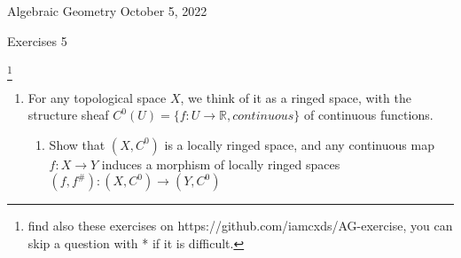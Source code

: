 \documentclass[a4paper,11pt]{article}
\def\bb#1{\mathbb{#1}}
\begin{document}
{\small Algebraic Geometry \hfill October 5, 2022 \\}
\begin{center}
\Huge Exercises 5
\end{center}

\vskip0.6cm
\footnote{find also these exercises on https://github.com/iamcxds/AG-exercise, you can skip a question with * if it is difficult.}

\begin{enumerate}[1.]

\item For any topological space $ X $, we think of it as a ringed space, with the structure sheaf $C^0(U)=\{f: U\to \bb{R},continuous \}$ of continuous functions.
\begin{enumerate}
    \item Show that $(X, C^0)$ is a locally ringed space, and any continuous map $f: X\to Y$ induces a morphism of locally ringed spaces $ (f,f^\#) : (X,C^0)\to (Y,C^0) $
    

\end{enumerate}
\end{enumerate}
\end{document}
